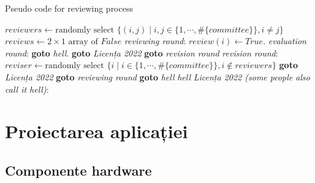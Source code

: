 \begin{algorithm}[ht]
    \caption{Pseudo code for reviewing process}\label{alg:acceptance}
    \begin{algorithmic}[1]
            \State $\textit{reviewers} \gets \text{randomly select } \{(i,j) \mid i,j \in  \{1, \cdots, \#\{\textit{committee}\}\}, i \neq j \}$
            \State $\textit{reviews} \gets 2 \times 1 \text{ array of } \textit{False}$
            \BState \emph{reviewing round}:
                    \State $\textit{review}(i) \gets \textit{True}$.
                \Else {}
                \EndIf
            \EndFor
            \BState \emph{evaluation round}:
                \State \textbf{goto} \emph{hell}.
                \State \textbf{goto} \emph{Licența 2022}
            \Else \textbf{ goto} \emph{revision round}
            \EndIf
            \BState \emph{revision round}:
            \State $\textit{reviser} \gets \text{randomly select } \{i \mid i \in  \{1, \cdots, \#\{\textit{committee}\}\}, i \not\in \textit{reviewers} \}$
                \State \textbf{ goto} \emph{Licența 2022}
                \State \textbf{ goto} \emph{reviewing round}
            \Else \textbf{ goto} \emph{hell}
            \EndIf
            \BState \emph{hell} 
            \State {}
            \BState \emph{Licența 2022 (some people also call it hell)}:
            \State {}
        \EndProcedure
    \end{algorithmic}
\end{algorithm}

\textcolor{gray}{\lipsum}
\fi


\chapter{Proiectarea aplicației}
\label{cap:cap2}

\section{Componente hardware}

